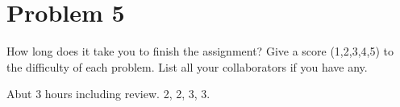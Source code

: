 \documentclass{article}
\begin{document}
\section*{Problem 5}
\begin{tcolorbox}[colback=gray!10, breakable]
	How long does it take you to finish the assignment? Give a score (1,2,3,4,5) to the difficulty of each problem. List all your collaborators if you have any.
\end{tcolorbox}
Abut 3 hours including review. 2, 2, 3, 3.
\end{document}
